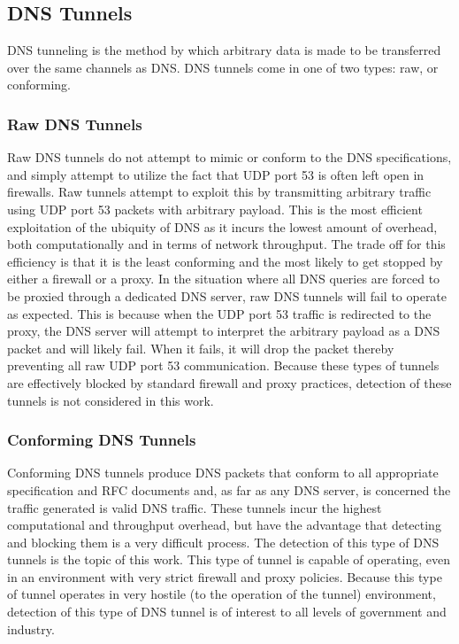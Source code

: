 \documentclass[12pt]{article}
\theoremstyle{remark}
\theoremstyle{definition}
\theoremstyle{definition}
\theoremstyle{definition}
\begin{document}
\subsection{DNS Tunnels}
\label{dnstunnels.types}

DNS tunneling is the method by which arbitrary data is made to be transferred
over the same channels as DNS. DNS tunnels come in one of two types: raw, or
conforming.

\subsubsection{Raw DNS Tunnels}
\label{dnstunnels.types.raw}
Raw DNS tunnels do not attempt to mimic or conform to the DNS
specifications, and simply attempt to utilize the fact that UDP port 53 is
often left open in firewalls. Raw tunnels attempt to exploit this by
transmitting arbitrary traffic using UDP port 53 packets with arbitrary payload.
This is the most efficient exploitation of the ubiquity of DNS as it incurs the
lowest amount of overhead, both computationally and in terms of network
throughput. The trade off for this efficiency is that it is the least
conforming and the most likely to get stopped by either a firewall or a proxy.
In the situation where all DNS queries are forced to be proxied through a
dedicated DNS server, raw DNS tunnels will fail to operate as expected. This is
because when the UDP port 53 traffic is redirected to the proxy, the DNS server
will attempt to interpret the arbitrary payload as a DNS packet and will likely
fail. When it fails, it will drop the packet thereby preventing all raw UDP
port 53 communication. Because these types of tunnels are effectively blocked by
standard firewall and proxy practices, detection of these tunnels is not
considered in this work.

\subsubsection{Conforming DNS Tunnels}
\label{dnstunnels.types.conforming}
Conforming DNS tunnels produce DNS packets that conform to all appropriate
specification and RFC documents and, as far as any DNS server, is concerned the
traffic generated is valid DNS traffic. These tunnels incur the highest
computational and throughput overhead, but have the advantage that detecting
and blocking them is a very difficult process. The detection of this type of
DNS tunnels is the topic of this work. This type of tunnel is capable of
operating, even in an environment with very strict firewall and proxy policies.
Because this type of tunnel operates in very hostile (to the operation of the
tunnel) environment, detection of this type of DNS tunnel is of interest to all
levels of government and industry.
\end{document}
